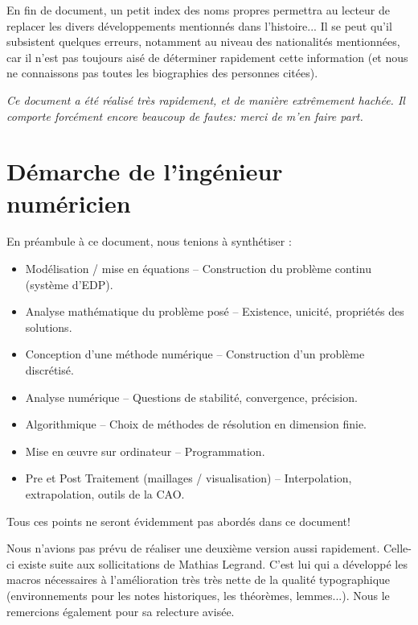 \documentclass[11pt,pdflatex]{book}
\begin{document}
\medskip
En fin de document, un petit index des noms propres permettra au lecteur
de replacer les divers développements mentionnés dans l'histoire...
Il se peut qu'il subsistent quelques erreurs, notamment au niveau des
nationalités mentionnées, car il n'est pas toujours aisé de déterminer rapidement cette 
information (et nous ne connaissons pas toutes les biographies des personnes citées).

\medskip
\emph{Ce document a été réalisé très rapidement, et de manière extrêmement hachée.
Il comporte forcément encore beaucoup de fautes: merci de m'en faire part.}




\bigskip
\section*{Démarche de l'ingénieur numéricien}

En préambule à ce document, nous tenions à synthétiser :
\begin{itemize}
   \item Modélisation / mise en équations -- Construction du problème continu (système d'EDP).
   \item Analyse mathématique du problème posé -- Existence, unicité, propriétés des solutions.
   \item Conception d'une méthode numérique -- Construction d'un problème discrétisé.
   \item Analyse numérique -- Questions de stabilité, convergence, précision.
   \item Algorithmique -- Choix de méthodes de résolution en dimension finie.
   \item Mise en œuvre sur ordinateur -- Programmation.
   \item Pre et Post Traitement (maillages / visualisation) -- Interpolation, extrapolation, outils de la CAO.
\end{itemize}

\medskip
Tous ces points ne seront évidemment pas abordés dans ce document!
\vfill
\noindent
{}

Nous n'avions pas prévu de réaliser une deuxième version aussi rapidement.
Celle-ci existe suite aux sollicitations de Mathias Legrand.
C'est lui  qui a développé les macros nécessaires à l'amélioration très très nette de la 
qualité typographique (environnements pour les notes historiques, les théorèmes, lemmes...).
Nous le remercions également pour sa relecture avisée.
\end{document}
